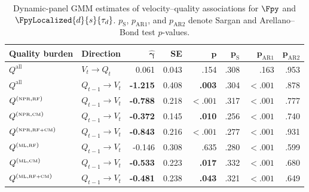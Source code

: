 \begin{table}[!t]
\centering
\scriptsize
\caption{Dynamic-panel GMM estimates of velocity--quality associations for $\Fpy$ and $\FpyLocalized{d}{s}{\tau_d}$. $p_{\mathrm{S}}$, $p_{\mathrm{AR1}}$, and $p_{\mathrm{AR2}}$ denote Sargan and Arellano--Bond test $p$-values.}
\label{tab:gmm-dynamic-interactions}
{\color{blue}
\begin{tabular}{@{}llrrrrrr@{}}
\textbf{Quality burden}
& \textbf{Direction}
& $\boldsymbol{\hat{\gamma}}$
& \textbf{SE}
& $\boldsymbol{p}$
& $\boldsymbol{p}_{\mathrm{S}}$
& $\boldsymbol{p}_{\mathrm{AR1}}$
& $\boldsymbol{p}_{\mathrm{AR2}}$ \\
\midrule

$Q^{\mathrm{all}}$
& $V_t \rightarrow Q_t$
& 0.061 & 0.043 & .154 & .308 & .163 & .953 \\

$Q^{\mathrm{all}}$
& $Q_{t-1} \rightarrow V_t$
& \textbf{-1.215} & 0.408 & \textbf{.003} & .304 & $<.001$ & .878 \\

\addlinespace
$Q^{(\text{\tiny NPR},\text{\tiny RF})}$
& $Q_{t-1} \rightarrow V_t$
& \textbf{-0.788} & 0.218 & $\boldsymbol{<.001}$ & .317 & $<.001$ & .777 \\

$Q^{(\text{\tiny NPR},\text{\tiny CM})}$
& $Q_{t-1} \rightarrow V_t$
& \textbf{-0.372} & 0.145 & \textbf{.010} & .256 & $<.001$ & .740 \\

$Q^{(\text{\tiny NPR},\text{\tiny RF{+}CM})}$
& $Q_{t-1} \rightarrow V_t$
& \textbf{-0.843} & 0.216 & $\boldsymbol{<.001}$ & .277 & $<.001$ & .931 \\

\addlinespace
$Q^{(\text{\tiny ML},\text{\tiny RF})}$
& $Q_{t-1} \rightarrow V_t$
& -0.146 & 0.308 & .635 & .280 & $<.001$ & .599 \\

$Q^{(\text{\tiny ML},\text{\tiny CM})}$
& $Q_{t-1} \rightarrow V_t$
& \textbf{-0.533} & 0.223 & \textbf{.017} & .332 & $<.001$ & .680 \\

$Q^{(\text{\tiny ML},\text{\tiny RF{+}CM})}$
& $Q_{t-1} \rightarrow V_t$
& \textbf{-0.481} & 0.238 & \textbf{.043} & .321 & $<.001$ & .649 \\
\end{tabular}
}
\end{table}
